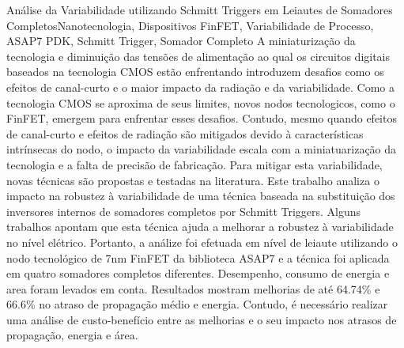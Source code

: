 \documentclass[ecp,tc, english]{iiufrgs}
\begin{document}
\begin{englishabstract}{Análise da Variabilidade utilizando Schmitt Triggers em Leiautes de Somadores Completos}{Nanotecnologia, Dispositivos FinFET, Variabilidade de Processo, ASAP7 PDK, Schmitt Trigger, Somador Completo}
A miniaturização da tecnologia e diminuição das tensões de alimentação ao qual os circuitos digitais baseados na tecnologia CMOS estão enfrentando introduzem desafios como os efeitos de canal-curto e o maior impacto da radiação e da variabilidade. Como a tecnologia CMOS se aproxima de seus limites, novos nodos tecnologicos, como o FinFET, emergem para enfrentar esses desafios. Contudo, mesmo quando efeitos de canal-curto e efeitos de radiação são mitigados devido à características intrínsecas do nodo, o impacto da variabilidade escala com a miniatuarização da tecnologia e a falta de precisão de fabricação. Para mitigar esta variabilidade, novas técnicas são propostas e testadas na literatura. Este trabalho analiza o impacto na robustez à variabilidade de uma técnica baseada na substituição dos inversores internos de somadores completos por Schmitt Triggers. Alguns trabalhos apontam que esta técnica ajuda a melhorar a robustez à variabilidade no nível elétrico. Portanto, a análize foi efetuada em nível de leiaute utilizando o nodo tecnológico de 7nm FinFET da biblioteca ASAP7 e a técnica foi aplicada em quatro somadores completos diferentes. Desempenho, consumo de energia e area foram levados em conta. Resultados mostram melhorias de até 64.74\% e 66.6\% no atraso de propagação médio e energia. Contudo, é necessário realizar uma análise de custo-benefício entre as melhorias e o seu impacto nos atrasos de propagação, energia e área.
\end{englishabstract}
\end{document}
